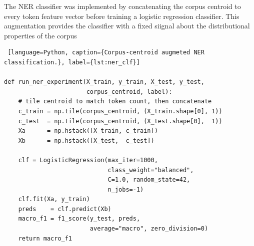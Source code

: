 \documentclass[11pt,a4paper]{article}
\begin{document}
The NER classifier was implemented by concatenating the corpus centroid to every token feature vector before training a logistic regression classifier. This augmentation provides the classifier with a fixed siignal about the distributional properties of the corpus


\begin{lstlisting} [language=Python, caption={Corpus-centroid augmeted NER classification.}, label={lst:ner_clf}]

def run_ner_experiment(X_train, y_train, X_test, y_test,
                       corpus_centroid, label):
    # tile centroid to match token count, then concatenate
    c_train = np.tile(corpus_centroid, (X_train.shape[0], 1))
    c_test  = np.tile(corpus_centroid, (X_test.shape[0],  1))
    Xa      = np.hstack([X_train, c_train])
    Xb      = np.hstack([X_test,  c_test])
 
    clf = LogisticRegression(max_iter=1000,
                             class_weight="balanced",
                             C=1.0, random_state=42,
                             n_jobs=-1)
    clf.fit(Xa, y_train)
    preds    = clf.predict(Xb)
    macro_f1 = f1_score(y_test, preds,
                        average="macro", zero_division=0)
    return macro_f1

\end{lstlisting}




  
\end{document}

